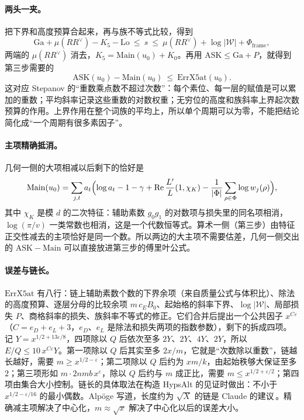 \documentclass[11pt]{article}
\renewcommand{\Re}{\operatorname{Re}}
\begin{document}
\paragraph{两头一夹。} 把下界和高度预算合起来，再与族不等式比较，得到
\[
\mathrm{Ga}+\mu(RR^\vee)-K_5-\overline{\mathrm{Lo}}\ \le\ s\ \le\ \mu(RR^\vee)+\log|\mathcal W|+\Phi_{\mathrm{frame}},
\]
两端的 $\mu(RR^\vee)$ 消去，$K_5=\mathrm{Main}(u_0)+K_0$。再用 $\mathrm{ASK}\le\mathrm{Ga}+P$，就得到第三步需要的
\[
\mathrm{ASK}(u_0)-\mathrm{Main}(u_0)\ \le\ \mathrm{ErrX5at}(u_0).
\]
这对应 Stepanov 的“重数乘点数不超过次数”：每个素位、每一层的赋值是可以累加的重数；平均斜率记录这些重数的对数权重；无穷位的高度和族斜率上界起次数预算的作用。上界作用在整个词族的平均上，所以单个周期可以为零，不能把结论简化成“一个周期有很多素因子”。

\paragraph{主项精确抵消。} 几何一侧的大项相减以后剩下的恰好是
\[
\mathrm{Main}(u_0)=\sum_{j,t}a_t\Bigl(\log a_t-1-\gamma+\Re\frac{L'}{L}(1,\chi_K)-\frac1{|\Phi|}\sum_{\rho\in\Phi}\log w_j(\rho)\Bigr),
\]
其中 $\chi_K$ 是模 $d$ 的二次特征：辅助素数 $g_0g_1$ 的对数项与损失里的同名项相消，$\log(\pi/v)$ 一类常数也相消，这是一个代数恒等式。算术一侧（第三步）由特征正交性减去的主项恰好是同一个数。所以两边的大主项不需要估差，几何一侧交出的 $\mathrm{ASK}-\mathrm{Main}$ 可以直接放进第三步的傅里叶公式。

\paragraph{误差与链长。} $\mathrm{ErrX5at}$ 有八行：链上辅助素数个数的下界余项（来自质量公式与体积比）、除法的高度预算、逐层分母的比较余项 $m\,c_EB_0$、起始格的斜率下界、$\log|\mathcal W|$、局部损失 $P$、商格斜率的损失、族斜率不等式的修正。它们合并后提出一个公共因子 $x^{C\varepsilon}$（$C=e_D+e_L+3$，$e_D$、$e_L$ 是除法和损失两项的指数参数），剩下的拆成四项。记 $Y=x^{1/2+13\varepsilon/8}$，四项除以 $Q$ 后依次至多 $2Y$、$2Y$、$4Y$、$2Y$，所以 $E/Q\le10\,x^{C\varepsilon}Y$。第一项除以 $Q$ 后其实至多 $2x/m$，它就是“次数除以重数”，链越长越好，需要 $m\ge x^{1/2-\varepsilon}$；第二项除以 $Q$ 后约为 $xm/k$，由起始秩够大保证至多 $2$；第三项形如 $m\cdot 2nmb\,x^{\varepsilon}$，除以 $Q$ 后约与 $m$ 成正比，需要 $m\le x^{1/2+\varepsilon/2}$；第四项由集合大小控制。链长的具体取法在构造 \textsf{HypsAlt} 的见证时做出：不小于 $x^{1/2-\varepsilon/16}$ 的最小偶数。Alpöge 写道，长度约为 $\sqrt X$ 的链是 Claude 的建议\,\cite{alpoge}。精确减主项解决了中心化，$m\approx\sqrt x$ 解决了中心化以后的误差大小。
\end{document}
